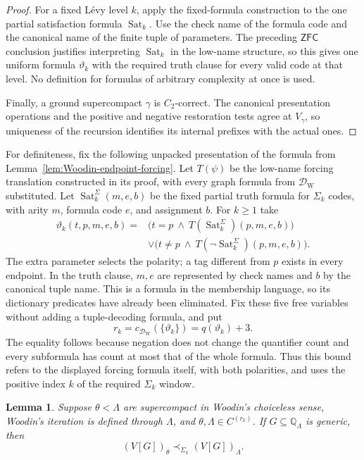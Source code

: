 \documentclass[11pt,a4paper]{amsart}
\newcommand{\ZFC}{\mathsf{ZFC}}
\theoremstyle{plain}
\newtheorem{lemma}[theorem]{Lemma}
\theoremstyle{definition}
\theoremstyle{remark}
\begin{document}
\begin{proof}
For a fixed L\'evy level $k$, apply the fixed-formula construction to
the one partial satisfaction formula $\operatorname{Sat}_k$.
Use the check name of the formula code and the canonical name of
the finite tuple of parameters.  The preceding $\ZFC$ conclusion
justifies interpreting $\operatorname{Sat}_k$ in the low-name
structure, so this gives one uniform formula $\vartheta_k$ with
the required truth clause for every valid code at that level.
No definition for formulas of arbitrary complexity at once is used.

Finally, a ground supercompact $\gamma$ is $C_2$-correct.
The canonical presentation operations and the positive and negative
restoration tests agree at $V_\gamma$, so uniqueness of the recursion
identifies its internal prefixes with the actual ones.
\end{proof}

{\color{auditgreen}
For definiteness, fix the following unpacked presentation of the formula from Lemma~\ref{lem:Woodin-endpoint-forcing}.  Let $T(\psi)$ be the low-name forcing translation constructed in its proof, with every graph formula from $\mathcal D_{\mathrm W}$ substituted.  Let $\operatorname{Sat}^{\Sigma}_k(m,e,b)$ be the fixed partial truth formula for $\Sigma_k$ codes, with arity $m$, formula code $e$, and assignment $b$.  For $k\geq1$ take
\[
\begin{split}
\vartheta_k(t,p,m,e,b)={}&
\bigl(t=p\ \land\ T(\operatorname{Sat}^{\Sigma}_k)(p,m,e,b)\bigr)\\
&\lor\bigl(t\ne p\ \land\ T(\neg\operatorname{Sat}^{\Sigma}_k)(p,m,e,b)\bigr).
\end{split}
\]
The extra parameter selects the polarity; a tag different from $p$ exists in every endpoint.  In the truth clause, $m,e$ are represented by check names and $b$ by the canonical tuple name.  This is a formula in the membership language, so its dictionary predicates have already been eliminated.  Fix these five free variables without adding a tuple-decoding formula, and put
\[
r_k=c_{\mathcal D_{\mathrm W}}(\{\vartheta_k\})
    =q(\vartheta_k)+3.
\]
The equality follows because negation does not change the quantifier count and every subformula has count at most that of the whole formula.  Thus this bound refers to the displayed forcing formula itself, with both polarities, and uses the positive index $k$ of the required $\Sigma_k$ window.
}

\begin{lemma}\label{lem:finite-windows}
Suppose $\theta<\Lambda$ are supercompact in Woodin's choiceless sense, Woodin's iteration is defined through $\Lambda$, and $\theta,\Lambda\in C^{(r_k)}$.  If $G\subseteq\mathbb Q_\Lambda$ is generic, then
\[
(V[G])_\theta\prec_{\Sigma_k}(V[G])_\Lambda.
\]
\end{lemma}
\end{document}
